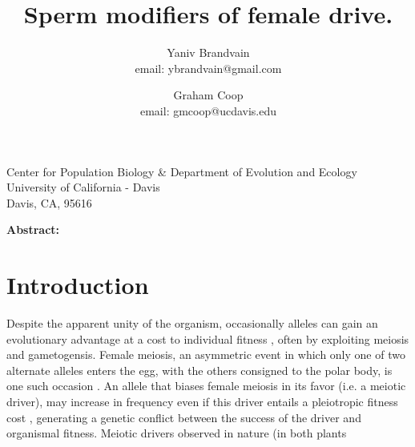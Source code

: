 \documentclass[12pt,letterpaper]{article}
\title{Sperm modifiers of female drive.}
\author{Yaniv Brandvain \\ email: ybrandvain@gmail.com  \and Graham Coop \\ email: gmcoop@ucdavis.edu }
\date{}
\begin{document}
\maketitle
\begin{center}
Center for Population Biology \& Department of Evolution and Ecology \\ University of California - Davis \\ Davis, CA, 95616
\end{center}

{\bf Abstract:}
\newpage

\section*{Introduction}

Despite the apparent unity of the organism, occasionally alleles can
gain an evolutionary advantage at a cost to  individual fitness
\citep{Burt2006}, often by exploiting meiosis and gametogensis.
Female meiosis, an asymmetric event in which only one of two alternate alleles
enters the  egg, with the others consigned to the polar body, is one such occasion \citep{Sandler1957,Pardo-ManuelDeVillena2001a}. 
An allele that biases female meiosis in its favor (i.e. a meiotic driver), may increase in frequency even if this driver entails a pleiotropic fitness cost \citep{Prout1973}, generating a genetic conflict between the success of the driver and organismal fitness.
Meiotic drivers observed in nature (in both plants
\end{document}

